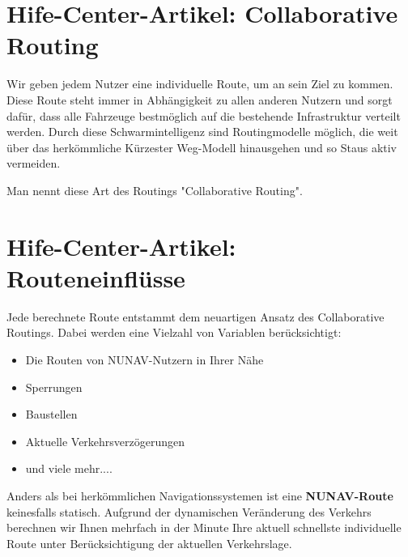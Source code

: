 


\section*{Hife-Center-Artikel: Collaborative Routing}
\label{sec:help_center_collaboratrive_routing}

Wir geben jedem Nutzer eine individuelle Route, um an sein Ziel zu kommen. Diese Route steht immer in Abhängigkeit zu allen anderen Nutzern und sorgt dafür, dass alle Fahrzeuge bestmöglich auf die bestehende Infrastruktur verteilt werden. Durch diese Schwarmintelligenz sind Routingmodelle möglich, die weit über das herkömmliche \glqq Kürzester Weg\grqq{}-Modell hinausgehen und so Staus aktiv vermeiden. 

\smallskip

\noindent Man nennt diese Art des Routings "Collaborative Routing". 

\section*{Hife-Center-Artikel: Routeneinflüsse}
\label{sec:help_center_routing_data}

\noindent Jede berechnete Route entstammt dem neuartigen Ansatz des Collaborative Routings. Dabei werden eine Vielzahl von Variablen berücksichtigt:

\begin{itemize}
    \item Die Routen von NUNAV-Nutzern in Ihrer Nähe
    \item Sperrungen
    \item Baustellen
    \item Aktuelle Verkehrsverzögerungen
    \item und viele mehr....
\end{itemize}

\noindent Anders als bei herkömmlichen Navigationssystemen ist eine \textbf{NUNAV-Route} keinesfalls statisch. Aufgrund der dynamischen Veränderung des Verkehrs berechnen wir Ihnen mehrfach in der Minute Ihre aktuell schnellste individuelle Route unter Berücksichtigung der aktuellen Verkehrslage.

